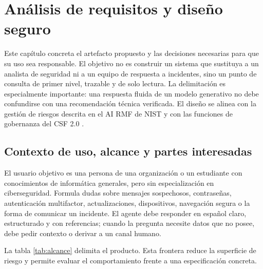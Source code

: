 \chapter{An\'alisis de requisitos y dise\~no seguro}
\label{chap:diseno}

Este cap\'itulo concreta el artefacto propuesto y las decisiones necesarias para que su uso sea responsable. El objetivo no es construir un sistema que sustituya a un analista de seguridad ni a un equipo de respuesta a incidentes, sino un punto de consulta de primer nivel, trazable y de solo lectura. La delimitaci\'on es especialmente importante: una respuesta fluida de un modelo generativo no debe confundirse con una recomendaci\'on t\'ecnica verificada. El dise\~no se alinea con la gesti\'on de riesgos descrita en el AI RMF de NIST \cite{nistAiRmf2023,nistGenAi2024} y con las funciones de gobernanza del CSF 2.0 \cite{nistCsf2024}.

\section{Contexto de uso, alcance y partes interesadas}

El usuario objetivo es una persona de una organizaci\'on o un estudiante con conocimientos de inform\'atica generales, pero sin especializaci\'on en ciberseguridad. Formula dudas sobre mensajes sospechosos, contrase\~nas, autenticaci\'on multifactor, actualizaciones, dispositivos, navegaci\'on segura o la forma de comunicar un incidente. El agente debe responder en espa\~nol claro, estructurado y con referencias; cuando la pregunta necesite datos que no posee, debe pedir contexto o derivar a un canal humano.

La tabla \ref{tab:alcance} delimita el producto. Esta frontera reduce la superficie de riesgo y permite evaluar el comportamiento frente a una especificaci\'on concreta.

